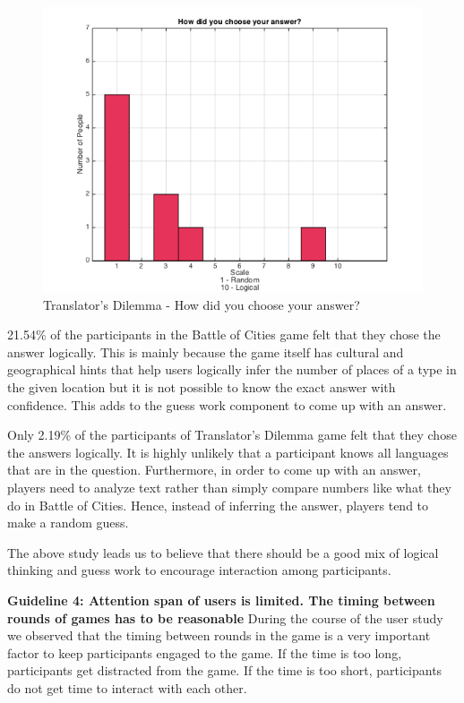 \documentclass{sig-alternate}
\begin{document}
\begin{figure}
	\includegraphics[width=\linewidth]{t_random_logical.png}
	\caption{Translator's Dilemma - How did you choose your answer?}
	\label{fig:t_random_logical}
\end{figure}

21.54\% of the participants in the Battle of Cities game felt that they chose the answer logically. This is mainly because the game itself has cultural and geographical hints that help users logically infer the number of places of a type in the given location but it is not possible to know the exact answer with confidence. This adds to the guess work component to come up with an answer.

Only 2.19\% of the participants of Translator's Dilemma game felt that they chose the answers logically. It is highly unlikely that a participant knows all languages that are in the question. Furthermore, in order to come up with an answer, players need to analyze text rather than simply compare numbers like what they do in Battle of Cities. Hence, instead of inferring the answer, players tend to make a random guess.

The above study leads us to believe that there should be a good mix of logical thinking and guess work to encourage interaction among participants. 

\textbf{Guideline 4: Attention span of users is limited. The timing between rounds of games has to be reasonable}
During the course of the user study we observed that the timing between rounds in the game is a very important factor to keep participants engaged to the game. If the time is too long, participants get distracted from the game. If the time is too short, participants do not get time to interact with each other. 
\end{document}
